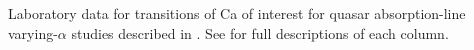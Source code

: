 Laboratory data for transitions of Ca of interest for quasar absorption-line varying-$\alpha$ studies described in . See  for full descriptions of each column.
